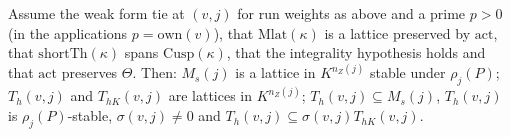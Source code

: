 \begin{lemma}\label{pf:onto2:latalg}
Assume the weak form tie at $(v,j)$ for run weights as above and a prime $p>0$ (in the applications $p=\mathrm{own}(v)$), that
$\mathrm{Mlat}(\kappa)$ is a lattice preserved by $\mathrm{act}$, that $\mathrm{shortTh}(\kappa)$ spans $\mathrm{Cusp}(\kappa)$, that
the integrality hypothesis holds and that $\mathrm{act}$ preserves $\Theta$. Then: $M_s(j)$ is a lattice in $K^{n_Z(j)}$ stable
under $\rho_j(P)$; $T_h(v,j)$ and $T_{hK}(v,j)$ are lattices in $K^{n_Z(j)}$; $T_h(v,j)\subseteq M_s(j)$, $T_h(v,j)$ is
$\rho_j(P)$-stable, $\sigma(v,j)\ne0$ and $T_h(v,j)\subseteq\sigma(v,j)T_{hK}(v,j)$.
\end{lemma}

